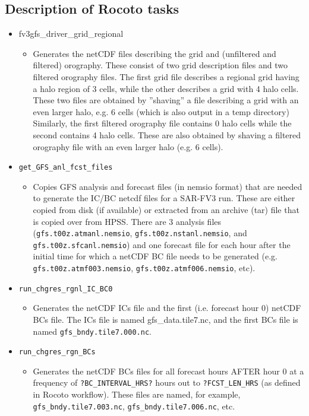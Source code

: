 \subsection{Description of Rocoto tasks}

\begin{itemize}
\item fv3gfs\_driver\_grid\_regional
    \begin{itemize}
    \item Generates the netCDF files describing the grid and (unfiltered and filtered) orography.  These consist of two grid description files and two filtered orography files.  The first grid file describes a regional grid having a halo region of 3 cells, while the other describes a grid with 4 halo cells.  These two files are obtained by ''shaving'' a file describing a grid with an even larger halo, e.g. 6 cells (which is also output in a temp directory)  Similarly, the first filtered orography file contains 0 halo cells while the second contains 4 halo cells.  These are also obtained by shaving a filtered orography file with an even larger halo (e.g. 6 cells).
    \end{itemize}
\item \verb|get_GFS_anl_fcst_files|
    \begin{itemize}
    \item Copies GFS analysis and forecast files (in nemsio format) that are needed to generate the IC/BC netcdf files for a SAR-FV3 run.  These are either copied from disk (if available) or extracted from an archive (tar) file that is copied over from HPSS.  There are 3 analysis files (\verb|gfs.t00z.atmanl.nemsio|, \verb|gfs.t00z.nstanl.nemsio|, and \verb|gfs.t00z.sfcanl.nemsio|) and one forecast file for each hour after the initial time for which a netCDF BC file needs to be generated (e.g. \verb|gfs.t00z.atmf003.nemsio|, \verb|gfs.t00z.atmf006.nemsio|, etc). 
    \end{itemize}
\item \verb|run_chgres_rgnl_IC_BC0|
    \begin{itemize}
    \item Generates the netCDF ICs file and the first (i.e. forecast hour 0) netCDF BCs file.  The ICs file is named gfs\_data.tile7.nc, and the first BCs file is named \verb|gfs_bndy.tile7.000.nc|.
    \end{itemize}
\item \verb|run_chgres_rgn_BCs|
    \begin{itemize}
    \item Generates the netCDF BCs files for all forecast hours AFTER hour 0 at a frequency of \verb|?BC_INTERVAL_HRS?| hours out to \verb|?FCST_LEN_HRS| (as defined in Rocoto workflow).  These files are named, for example, \verb|gfs_bndy.tile7.003.nc|, \verb|gfs_bndy.tile7.006.nc|, etc.

\end{itemize}
\end{itemize}
